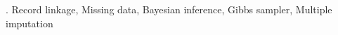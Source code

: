 \documentclass[12pt]{article}
\begin{document}
\vskip 2mm

.
Record linkage, Missing data, Bayesian inference, Gibbs sampler, Multiple imputation 


%        
%
%        







\end{document}
